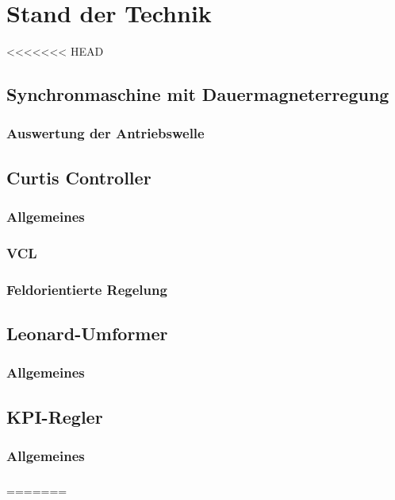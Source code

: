 \chapter{Stand der Technik}
<<<<<<< HEAD


\section{Synchronmaschine mit Dauermagneterregung}
\subsection{Auswertung der Antriebswelle}

\section{Curtis Controller}
\subsection{Allgemeines}
\subsection{VCL}
\subsection{Feldorientierte Regelung}

\section{Leonard-Umformer}
\subsection{Allgemeines}
\subsection{ }

\section{KPI-Regler}
\subsection{Allgemeines}
\subsection{ }
=======
